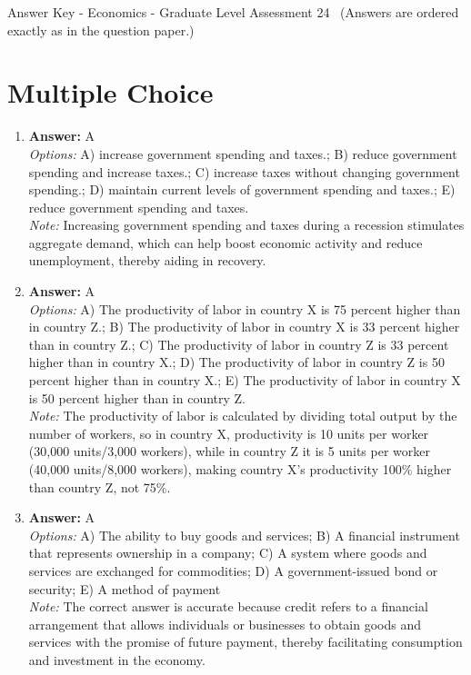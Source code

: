 \documentclass[12pt]{article}
\begin{document}
\begin{center}
Answer Key - Economics - Graduate Level Assessment 24 \
\small (Answers are ordered exactly as in the question paper.)
\end{center}

\section*{Multiple Choice}
\begin{enumerate}[label=\arabic*.]
\item \textbf{Answer:} A
\\ \textit{Options:} A) increase government spending and taxes.; B) reduce government spending and increase taxes.; C) increase taxes without changing government spending.; D) maintain current levels of government spending and taxes.; E) reduce government spending and taxes.
\\ \textit{Note:} Increasing government spending and taxes during a recession stimulates aggregate demand, which can help boost economic activity and reduce unemployment, thereby aiding in recovery.
\item \textbf{Answer:} A
\\ \textit{Options:} A) The productivity of labor in country X is 75 percent higher than in country Z.; B) The productivity of labor in country X is 33 percent higher than in country Z.; C) The productivity of labor in country Z is 33 percent higher than in country X.; D) The productivity of labor in country Z is 50 percent higher than in country X.; E) The productivity of labor in country X is 50 percent higher than in country Z.
\\ \textit{Note:} The productivity of labor is calculated by dividing total output by the number of workers, so in country X, productivity is 10 units per worker (30,000 units/3,000 workers), while in country Z it is 5 units per worker (40,000 units/8,000 workers), making country X's productivity 100\% higher than country Z, not 75\%.
\item \textbf{Answer:} A
\\ \textit{Options:} A) The ability to buy goods and services; B) A financial instrument that represents ownership in a company; C) A system where goods and services are exchanged for commodities; D) A government-issued bond or security; E) A method of payment
\\ \textit{Note:} The correct answer is accurate because credit refers to a financial arrangement that allows individuals or businesses to obtain goods and services with the promise of future payment, thereby facilitating consumption and investment in the economy.

\end{enumerate}
\end{document}

